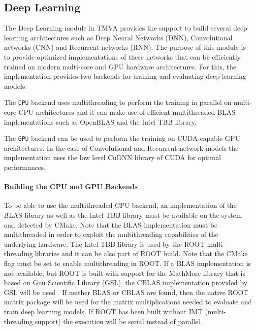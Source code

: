 \subsection{Deep Learning }
\label{sec:dl}

The Deep Learning module in TMVA provides the support to build several deep
learning architectures such as Deep Neural Networks (DNN), Convolutional networks (CNN) and
Recurrent networks (RNN).
The purpose of this module is to provide
optimized implementations of these networks
that can be efficiently trained on modern multi-core and GPU
hardware architectures.
For this,  the implementation provides two
backends for training and evaluating deep learning models.

The {\tt CPU} backend uses multithreading to perform
the training in parallel on multi-core CPU architectures and it can make use of  
efficient multithreaded BLAS implementations such as OpenBLAS and the Intel TBB library.

The {\tt GPU} backend can be used to perform the training on
CUDA-capable GPU architectures. In the case of Convolutional and Recurrent network models
the implementation uses the low level  CuDNN library of CUDA for optimal performances.


\paragraph{Building the CPU and GPU Backends}


To be able to use the multithreaded CPU backend, an implementation of the BLAS
library as well as the Intel TBB library must be available on the
system and detected by CMake. Note that the BLAS implementation must be
multithreaded in order to exploit the multithreading capabilities of
the underlying hardware.
The Intel TBB library  is used by the ROOT multi-threading libraries and it can be also part of
ROOT build. Note that the  CMake flag must be set
to enable multithreading in ROOT.
If a BLAS implementation is not available, but ROOT is built with support for
the MathMore library that is based on Gnu Scientific Library (GSL), the CBLAS implementation provided by GSL will be used .
If neither BLAS or CBLAS are found, then the native ROOT matrix package will be used for
the matrix multiplications needed to evaluate and train deep learning models.
If  ROOT has been built without IMT (multi-threading support) the execution will be serial instead of parallel. 

